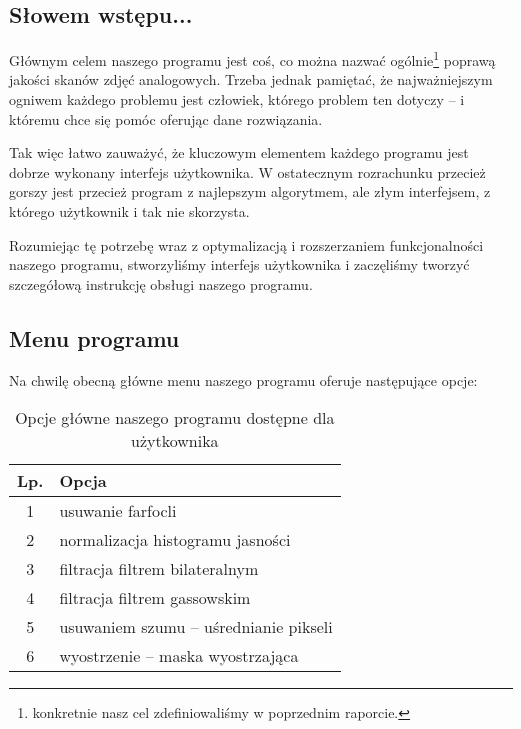 \documentclass[]{mwart}
\begin{document}
\subsection{Słowem wstępu...}
Głównym celem naszego programu jest coś, co można nazwać
ogólnie\footnote{konkretnie nasz cel zdefiniowaliśmy w poprzednim raporcie.}
poprawą jakości skanów zdjęć analogowych. Trzeba jednak pamiętać,
że najważniejszym ogniwem każdego problemu jest człowiek, którego
problem ten dotyczy -- i któremu chce się pomóc oferując dane rozwiązania. \newline

Tak więc łatwo zauważyć, że kluczowym elementem każdego programu jest dobrze wykonany
interfejs użytkownika. W ostatecznym rozrachunku przecież gorszy
jest przecież program z najlepszym algorytmem, ale złym interfejsem, z którego użytkownik i tak nie skorzysta. \newline


Rozumiejąc tę potrzebę wraz z optymalizacją i rozszerzaniem funkcjonalności
naszego programu, stworzyliśmy interfejs użytkownika i zaczęliśmy %
tworzyć szczegółową instrukcję obsługi naszego programu.

\subsection{Menu programu}
Na chwilę obecną główne menu naszego programu oferuje następujące opcje:

\begin{table}[h]
    \centering
    \begin{tabular}{|c|l|}
        \hline
        Lp. & Opcja                                  \\ \hline
        1   & usuwanie farfocli                      \\ \hline      %
        2   & normalizacja histogramu jasności       \\ \hline      %
        3   & filtracja filtrem bilateralnym         \\ \hline      %
        4   & filtracja filtrem gassowskim           \\ \hline      %
        5   & usuwaniem szumu -- uśrednianie pikseli \\ \hline      %
        6   & wyostrzenie -- maska wyostrzająca      \\ \hline      %
    \end{tabular}
    \caption{Opcje główne naszego programu dostępne dla użytkownika}
\end{table}
\end{document}
